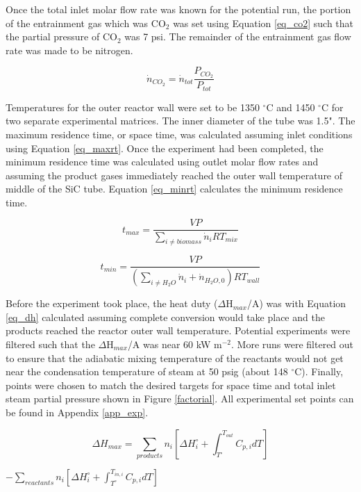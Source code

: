 \documentclass[11pt,twocolumn]{article}
\begin{document}
Once the total inlet molar flow rate was known for the potential run, the portion of the entrainment gas which was CO$_2$ was set using Equation \ref{eq_co2} such that the partial pressure of CO$_2$ was 7 psi.   The remainder of the entrainment gas flow rate was made to be nitrogen.

\begin{equation}
\dot{n}_{CO_2} = \dot{n}_{tot}\frac{P_{CO_2}}{P_{tot}}
\label{eq_co2}
\end{equation}

Temperatures for the outer reactor wall were set to be 1350 $^\circ$C and 1450 $^\circ$C for two separate experimental matrices.  The inner diameter of the tube was 1.5".  The maximum residence time, or space time, was calculated assuming inlet conditions using Equation \ref{eq_maxrt}.  Once the experiment had been completed, the minimum residence time was calculated using outlet molar flow rates and assuming the product gases immediately reached the outer wall temperature of middle of the SiC tube.  Equation \ref{eq_minrt} calculates the minimum residence time.

\begin{equation}
	t_{max}= \frac{VP}{\sum_{i \ne biomass}\dot{n}_{i}RT_{mix}}
	\label{eq_maxrt}
\end{equation}

\begin{equation}
	t_{min} = \frac{VP}{(\sum_{i \ne H_{2}O}\dot{n}_{i}+\dot{n}_{H_{2}O,0})RT_{wall}}
	\label{eq_minrt}
\end{equation}

Before the experiment took place, the heat duty ($\Delta$H$_{max}$/A) was with Equation \ref{eq_dh} calculated assuming complete conversion would take place and the products reached the reactor outer wall temperature.  Potential experiments were filtered such that the $\Delta$H$_{max}$/A was near 60 kW m$^{-2}$.  More runs were filtered out to ensure that the adiabatic mixing temperature of the reactants would not get near the condensation temperature of steam at 50 psig (about 148 $^\circ$C).  Finally, points were chosen to match the desired targets for space time and total inlet steam partial pressure shown in Figure \ref{factorial}.  All experimental set points can be found in Appendix \ref{app_exp}.

\begin{equation}
	\Delta H_{max} = \sum_{products}n_{i}\left[\Delta H_{i}^{\circ}+\int_{T^{\circ}}^{T_{out}}C_{p,i}dT\right] 
	\label{eq_dh}
\end{equation} 
\begin{center}
\begin{math}
 - \sum_{reactants}n_{i}\left[\Delta H_{i}^{\circ}+\int_{T^{\circ}}^{T_{in,i}}C_{p,i}dT\right]
\end{math}
\end{center}
\end{document}
